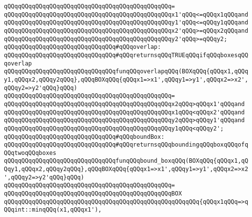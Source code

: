 \verb|qQQqqQQqqQQqqQQqqQQqqQQqqQQqqQQqqQQqqQQqqQQqqQQq=|\newline
\verb|qQQqqQQqqQQqqQQqqQQqqQQqqQQqqQQqqQQqqQQqqQQqqQQqx1'qQQq<=qQQqx1qQQqand|\newline
\verb|qQQqqQQqqQQqqQQqqQQqqQQqqQQqqQQqqQQqqQQqqQQqqQQqy1'qQQq<=qQQqy1qQQqand|\newline
\verb|qQQqqQQqqQQqqQQqqQQqqQQqqQQqqQQqqQQqqQQqqQQqqQQqx2'qQQq>=qQQqx2qQQqand|\newline
\verb|qQQqqQQqqQQqqQQqqQQqqQQqqQQqqQQqqQQqqQQqqQQqqQQqy2'qQQq>=qQQqy2;|\newline
\newline
\verb|qQQqqQQqqQQqqQQqqQQqqQQqqQQqqQQq#qQQqoverlap:|\newline
\verb|qQQqqQQqqQQqqQQqqQQqqQQqqQQqqQQq#qQQqreturnsqQQqTRUEqQQqifqQQqboxesqQQqoverlap|\newline
\newline
\verb|qQQqqQQqqQQqqQQqqQQqqQQqqQQqqQQqfunqQQqoverlapqQQq(BOXqQQq{qQQqx1,qQQqy1,qQQqx2,qQQqy2qQQq},qQQqBOXqQQq{qQQqx1=>x1',qQQqy1=>y1',qQQqx2=>x2',qQQqy2=>y2'qQQq}qQQq)|\newline
\verb|qQQqqQQqqQQqqQQqqQQqqQQqqQQqqQQqqQQqqQQqqQQqqQQq=|\newline
\verb|qQQqqQQqqQQqqQQqqQQqqQQqqQQqqQQqqQQqqQQqqQQqqQQqx2qQQq>qQQqx1'qQQqand|\newline
\verb|qQQqqQQqqQQqqQQqqQQqqQQqqQQqqQQqqQQqqQQqqQQqqQQqx1qQQq<qQQqx2'qQQqand|\newline
\verb|qQQqqQQqqQQqqQQqqQQqqQQqqQQqqQQqqQQqqQQqqQQqqQQqy2qQQq>qQQqy1'qQQqand|\newline
\verb|qQQqqQQqqQQqqQQqqQQqqQQqqQQqqQQqqQQqqQQqqQQqqQQqy1qQQq<qQQqy2';|\newline
\newline
\verb|qQQqqQQqqQQqqQQqqQQqqQQqqQQqqQQq#qQQqboundBox:|\newline
\verb|qQQqqQQqqQQqqQQqqQQqqQQqqQQqqQQq#qQQqreturnsqQQqboundingqQQqboxqQQqofqQQqtwoqQQqboxes|\newline
\newline
\verb|qQQqqQQqqQQqqQQqqQQqqQQqqQQqqQQqfunqQQqbound_boxqQQq(BOXqQQq{qQQqx1,qQQqy1,qQQqx2,qQQqy2qQQq},qQQqBOXqQQq{qQQqx1=>x1',qQQqy1=>y1',qQQqx2=>x2',qQQqy2=>y2'qQQq}qQQq)|\newline
\verb|qQQqqQQqqQQqqQQqqQQqqQQqqQQqqQQqqQQqqQQqqQQqqQQq=|\newline
\verb|qQQqqQQqqQQqqQQqqQQqqQQqqQQqqQQqqQQqqQQqqQQqqQQqBOX|\newline
\verb|qQQqqQQqqQQqqQQqqQQqqQQqqQQqqQQqqQQqqQQqqQQqqQQqqQQqqQQq{qQQqx1qQQq=>qQQqint::minqQQq(x1,qQQqx1'),|\newline
